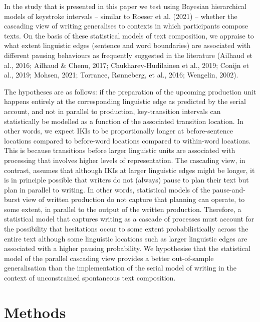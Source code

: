 \documentclass[
  man,floatsintext]{apa7}
\begin{document}
In the study that is presented in this paper we test using Bayesian hierarchical models of keystroke intervals -- similar to Roeser et al. (2021) -- whether the cascading view of writing generalises to contexts in which participants compose texts. On the basis of these statistical models of text composition, we appraise to what extent linguistic edges (sentence and word boundaries) are associated with different pausing behaviours as frequently suggested in the literature (Ailhaud et al., 2016; Ailhaud \& Chenu, 2017; Chukharev-Hudilainen et al., 2019; Conijn et al., 2019; Mohsen, 2021; Torrance, Rønneberg, et al., 2016; Wengelin, 2002).

The hypotheses are as follows: if the preparation of the upcoming production unit happens entirely at the corresponding linguistic edge as predicted by the serial account, and not in parallel to production, key-transition intervals can statistically be modelled as a function of the associated transition location. In other words, we expect IKIs to be proportionally longer at before-sentence locations compared to before-word locations compared to within-word locations. This is because transitions before larger linguistic units are associated with processing that involves higher levels of representation. The cascading view, in contrast, assumes that although IKIs at larger linguistic edges might be longer, it is in principle possible that writers do not (always) pause to plan their text but plan in parallel to writing. In other words, statistical models of the pause-and-burst view of written production do not capture that planning can operate, to some extent, in parallel to the output of the written production. Therefore, a statistical model that captures writing as a cascade of processes must account for the possibility that hesitations occur to some extent probabilistically across the entire text although some linguistic locations such as larger linguistic edges are associated with a higher pausing probability. We hypothesise that the statistical model of the parallel cascading view provides a better out-of-sample generalisation than the implementation of the serial model of writing in the context of unconstrained spontaneous text composition.

\hypertarget{methods}{%
\section{Methods}\label{methods}}
\end{document}
